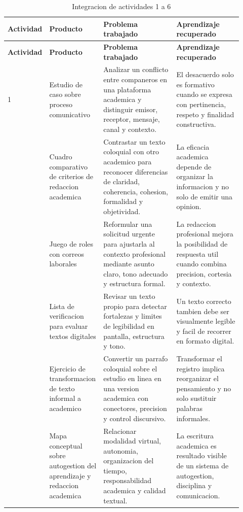 \documentclass[
	spanish,
	letterpaper, oneside
]{article}
\begin{document}
\begingroup
\small
\setlength{\tabcolsep}{5pt}
\renewcommand{\arraystretch}{1.28}
\begin{longtable}{@{}p{0.10\linewidth}p{0.23\linewidth}p{0.31\linewidth}p{0.28\linewidth}@{}}
\caption{Integracion de actividades 1 a 6}\label{tab:portafolio-evidencias}\\
\toprule
\textbf{Actividad} & \textbf{Producto} & \textbf{Problema trabajado} & \textbf{Aprendizaje recuperado} \\
\midrule
\endfirsthead
\toprule
\textbf{Actividad} & \textbf{Producto} & \textbf{Problema trabajado} & \textbf{Aprendizaje recuperado} \\
\midrule
\endhead
1 & Estudio de caso sobre proceso comunicativo & Analizar un conflicto entre companeros en una plataforma academica y distinguir emisor, receptor, mensaje, canal y contexto. & El desacuerdo solo es formativo cuando se expresa con pertinencia, respeto y finalidad constructiva. \\
\addlinespace
2 & Cuadro comparativo de criterios de redaccion academica & Contrastar un texto coloquial con otro academico para reconocer diferencias de claridad, coherencia, cohesion, formalidad y objetividad. & La eficacia academica depende de organizar la informacion y no solo de emitir una opinion. \\
\addlinespace
3 & Juego de roles con correos laborales & Reformular una solicitud urgente para ajustarla al contexto profesional mediante asunto claro, tono adecuado y estructura formal. & La redaccion profesional mejora la posibilidad de respuesta util cuando combina precision, cortesia y contexto. \\
\addlinespace
4 & Lista de verificacion para evaluar textos digitales & Revisar un texto propio para detectar fortalezas y limites de legibilidad en pantalla, estructura y tono. & Un texto correcto tambien debe ser visualmente legible y facil de recorrer en formato digital. \\
\addlinespace
5 & Ejercicio de transformacion de texto informal a academico & Convertir un parrafo coloquial sobre el estudio en linea en una version academica con conectores, precision y control discursivo. & Transformar el registro implica reorganizar el pensamiento y no solo sustituir palabras informales. \\
\addlinespace
6 & Mapa conceptual sobre autogestion del aprendizaje y redaccion academica & Relacionar modalidad virtual, autonomia, organizacion del tiempo, responsabilidad academica y calidad textual. & La escritura academica es resultado visible de un sistema de autogestion, disciplina y comunicacion. \\
\bottomrule
\end{longtable}
\endgroup
\end{document}

